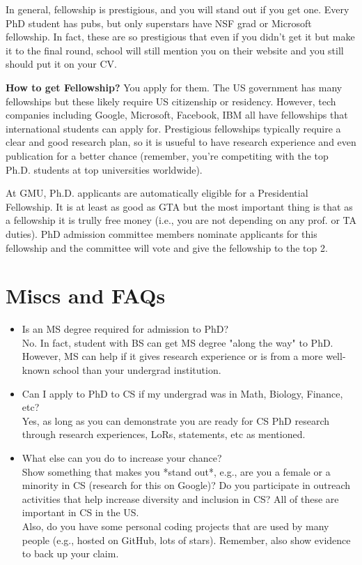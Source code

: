 \documentclass[10pt]{article}
\begin{document}
In general, fellowship is prestigious, and you will stand out if you get one.  Every PhD student has pubs, but only superstars have NSF grad or Microsoft fellowship. In fact, these are so prestigious that even if you didn't get it but make it to the final round, school will still mention you on their website and you still should put it on your CV.


\textbf{How to get Fellowship?} You apply for them.  The US government has many fellowships but these likely require US citizenship or residency.  However, tech companies including Google, Microsoft, Facebook, IBM all have fellowships that international students can apply for. Prestigious fellowships typically require a clear and good research plan, so it is usueful to have research experience and even publication for a better chance (remember, you're competiting with the top Ph.D. students at top universities worldwide). 


\begin{tcolorbox}[left=1pt,right=1pt,top=1pt,bottom=1pt]
At GMU, Ph.D. applicants are automatically eligible for a Presidential Fellowship.  It is at least as good as GTA but the most important thing is that as a fellowship it is trully free money (i.e., you are not depending on any prof. or TA duties).  PhD admission committee members nominate applicants for this fellowship and the committee will vote and give the fellowship to the top 2.
\end{tcolorbox}


\section{Miscs and FAQs}

\begin{itemize}
    \item   Is an MS degree required for admission to PhD?\\
    No. In fact, student with BS can get MS degree "along the way" to PhD.  However, MS can help if it gives research experience or is from a more well-known school than your undergrad institution.
    \item Can I apply to PhD to CS if my undergrad was in Math, Biology, Finance, etc?\\
    Yes, as long as you can demonstrate you are ready for CS PhD research through research experiences, LoRs, statements, etc as mentioned.
    \item What else can you do to increase your chance?\\
    Show something that makes you *stand out*, e.g., are you a female or a minority in CS (research for this on Google)? Do you participate in outreach activities that help increase diversity and inclusion in CS?  All of these are important in CS in the US.\\
    
    Also, do you have some personal coding projects that are used by many people (e.g., hosted on GitHub, lots of stars).  Remember, also show evidence to back up your claim.
\end{itemize}
\end{document}
